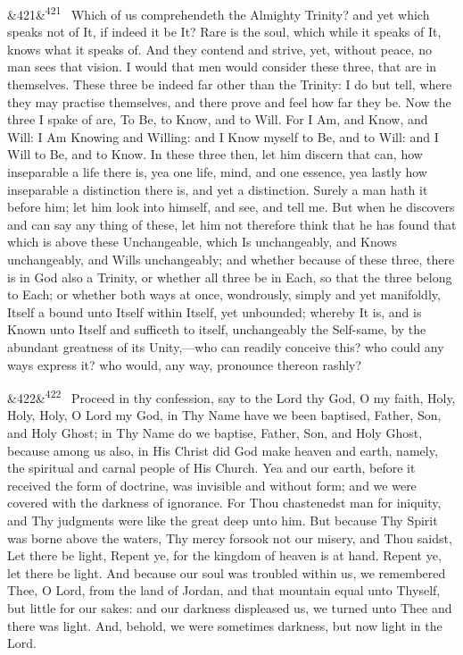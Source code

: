\documentclass[12pt]{article}
\newcommand{\para}[1][]{\par\noindent\ifx&#1&\else\textsuperscript{\footnotesize #1}~\fi}
\begin{document}
\para[421] Which of us comprehendeth the Almighty Trinity? and yet which speaks not of It, if indeed it be It? Rare is the soul, which while it speaks of It, knows what it speaks of. And they contend and strive, yet, without peace, no man sees that vision. I would that men would consider these three, that are in themselves. These three be indeed far other than the Trinity: I do but tell, where they may practise themselves, and there prove and feel how far they be. Now the three I spake of are, To Be, to Know, and to Will. For I Am, and Know, and Will: I Am Knowing and Willing: and I Know myself to Be, and to Will: and I Will to Be, and to Know. In these three then, let him discern that can, how inseparable a life there is, yea one life, mind, and one essence, yea lastly how inseparable a distinction there is, and yet a distinction. Surely a man hath it before him; let him look into himself, and see, and tell me. But when he discovers and can say any thing of these, let him not therefore think that he has found that which is above these Unchangeable, which Is unchangeably, and Knows unchangeably, and Wills unchangeably; and whether because of these three, there is in God also a Trinity, or whether all three be in Each, so that the three belong to Each; or whether both ways at once, wondrously, simply and yet manifoldly, Itself a bound unto Itself within Itself, yet unbounded; whereby It is, and is Known unto Itself and sufficeth to itself, unchangeably the Self-same, by the abundant greatness of its Unity,---who can readily conceive this? who could any ways express it? who would, any way, pronounce thereon rashly?

\para[422] Proceed in thy confession, say to the Lord thy God, O my faith, Holy, Holy, Holy, O Lord my God, in Thy Name have we been baptised, Father, Son, and Holy Ghost; in Thy Name do we baptise, Father, Son, and Holy Ghost, because among us also, in His Christ did God make heaven and earth, namely, the spiritual and carnal people of His Church. Yea and our earth, before it received the form of doctrine, was invisible and without form; and we were covered with the darkness of ignorance. For Thou chastenedst man for iniquity, and Thy judgments were like the great deep unto him. But because Thy Spirit was borne above the waters, Thy mercy forsook not our misery, and Thou saidst, Let there be light, Repent ye, for the kingdom of heaven is at hand. Repent ye, let there be light. And because our soul was troubled within us, we remembered Thee, O Lord, from the land of Jordan, and that mountain equal unto Thyself, but little for our sakes: and our darkness displeased us, we turned unto Thee and there was light. And, behold, we were sometimes darkness, but now light in the Lord.
\end{document}
